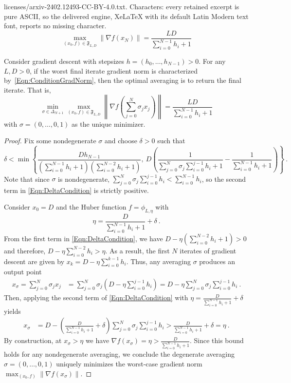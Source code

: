 \documentclass[10pt,a4paper]{amsart}
\newcommand{\sumH}[1]{\sum_{i=0}^{#1} h_i}
\newcommand{\sumSigH}{\sum_{j=0}^N \sigma_j \sum_{i=0}^{j-1} h_i}
\newcommand{\xSpecial}{x_\sigma}
\begin{document}
licenses/arxiv-2402.12493-CC-BY-4.0.txt. Characters: every retained excerpt is pure ASCII, so the delivered engine, XeLaTeX with its default Latin Modern text font, reports no missing character.
\begin{equation}\label{Eqn:ConditionGradNorm}
    \max_{(x_0,f)\in \mathfrak{F}_{L,D}} \| \nabla f(x_N) \| = \frac{LD}{\sumH{N-1}+1} \tag{C2}
\end{equation}

\begin{theorem}\label{Thm:AvgGradNorm}
    Consider gradient descent with stepsizes $h=(h_0, \dots, h_{N-1}) > 0$. For any $L,D > 0$, if the worst final iterate gradient norm is characterized by~\eqref{Eqn:ConditionGradNorm}, then the optimal averaging is to return the final iterate. That is,
    \begin{equation}\label{Eqn:minMaxGradNorm}
        \min_{\sigma\in\Delta_{N+1}} \max_{(x_0,f)\in \mathfrak{F}_{L,D}} \left\|\nabla f\left(\sum^{N}_{j=0} \sigma_j x_j\right) \right\| = \frac{LD}{\sumH{N-1}+1}
    \end{equation}
    with $\sigma = (0,\dots,0,1)$ as the unique minimizer.
\end{theorem}

\begin{proof}
    Fix some nondegenerate $\sigma$ and choose $\delta>0$ such that
    \begin{equation}\label{Eqn:DeltaCondition}
        \delta < \min \left\{\frac{D h_{N-1}}{(\sumH{N-1}+1)(\sumH{N-2}+1)}, \ D\left(\frac{1}{\sumSigH + 1} - \frac{1}{\sumH{N-1} + 1}\right) \right\} \ .
    \end{equation}
    Note that since $\sigma$ is nondegenerate, $\sumSigH < \sumH{N-1}$, so the second term in \eqref{Eqn:DeltaCondition} is strictly positive.

    Consider $x_0=D$ and the Huber function $f= \phi_{L,\eta}$ with
    \begin{equation*}
        \eta = \frac{D}{\sum_{i=0}^{N-1}h_i +1} +\delta \ .
    \end{equation*}
    From the first term in \eqref{Eqn:DeltaCondition}, we have $D - \eta (\sumH{N-2} + 1) > 0$ and therefore, $D-\eta\sumH{N-2} > \eta$. As a result, the first $N$ iterates of gradient descent are given by $x_k = D - \eta\sumH{k-1}$. Thus, any averaging $\sigma$ produces an output point
    \begin{align*}
        \xSpecial = \sum_{j=0}^{N} \sigma_j x_j & = \sum_{j=0}^N \sigma_j (D-\eta\sum_{i=0}^{j-1}h_i) = D-\eta\sumSigH \ .
    \end{align*}
    Then, applying the second term of \eqref{Eqn:DeltaCondition} with $\eta = \frac{D}{\sum_{i=0}^{N-1}h_i +1} +\delta$ yields
    \begin{align*}
        \xSpecial & = D- \left(\frac{D}{\sum_{i=0}^{N-1}h_i +1} +\delta\right)\sumSigH > \frac{D}{\sumH{N-1} +1} + \delta = \eta \ . 
    \end{align*}
    By construction, at $\xSpecial > \eta$ we have $\nabla f(\xSpecial) = \eta > \frac{D}{\sumH{N-1} +1}$. Since this bound holds for any nondegenerate averaging, we conclude the degenerate averaging $\sigma = (0,\dots,0,1)$ uniquely minimizes the worst-case gradient norm $\max_{(x_0,f)}\|\nabla f(\xSpecial)\|$.
\end{proof}
\end{document}

